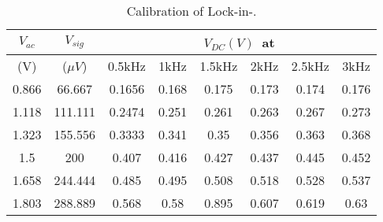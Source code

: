\begin{table}[H]
\caption{Calibration of Lock-in-\amp.}
\label{tab1}
\begin{tabular}{|c|c|c|c|c|c|c|c|}
\hline
$V_{ac}$ & $V_{sig}$ & \multicolumn{6}{c|}{$V_{DC}(V)$\ at }                             \\ \hline
(V)        & ($\mu V$)   & 0.5kHz & 1kHz & 1.5kHz & 2kHz & 2.5kHz & 3kHz \\ \hline
0.866    & 66.667    & 0.1656    & 0.168   & 0.175  & 0.173   & 0.174     & 0.176   \\ \hline
1.118    & 111.111   & 0.2474    & 0.251   & 0.261  & 0.263   & 0.267     & 0.273   \\ \hline
1.323    & 155.556   & 0.3333    & 0.341   & 0.35   & 0.356   & 0.363     & 0.368   \\ \hline
1.5      & 200       & 0.407     & 0.416   & 0.427  & 0.437   & 0.445     & 0.452   \\ \hline
1.658    & 244.444   & 0.485     & 0.495   & 0.508  & 0.518   & 0.528     & 0.537   \\ \hline
1.803    & 288.889   & 0.568     & 0.58    & 0.895  & 0.607   & 0.619     & 0.63    \\ \hline
\end{tabular}
\end{table}